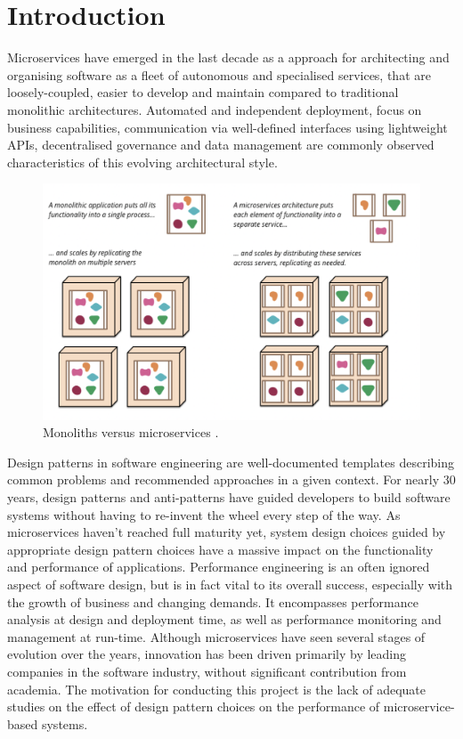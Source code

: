 \chapter{Introduction}

Microservices have emerged in the last decade as a approach for architecting and organising software as a fleet of autonomous and specialised services, that are loosely-coupled, easier to develop and maintain compared to traditional monolithic architectures. Automated and independent deployment, focus on business capabilities, communication via well-defined interfaces using lightweight APIs, decentralised governance and data management are commonly observed characteristics of this evolving architectural style.

\begin{figure}[ht]
  \centering
  \includegraphics[width=0.65\linewidth]{./assets/images/mono-micro-lewis.png}
  \caption{Monoliths versus microservices \cite{lewis14}.}
  \label{fig:mono-micro-lewis}
\end{figure}

Design patterns in software engineering are well-documented templates describing common problems and recommended approaches in a given context. For nearly 30 years, design patterns and anti-patterns have guided developers to build software systems without having to re-invent the wheel every step of the way. As microservices haven't reached full maturity yet, system design choices guided by appropriate design pattern choices have a massive impact on the functionality and performance of applications. Performance engineering is an often ignored aspect of software design, but is in fact vital to its overall success, especially with the growth of business and changing demands. It encompasses performance analysis at design and deployment time, as well as performance monitoring and management at run-time. Although microservices have seen several stages of evolution over the years, innovation has been driven primarily by leading companies in the software industry, without significant contribution from academia. The motivation for conducting this project is the lack of adequate studies on the effect of design pattern choices on the performance of microservice-based systems.

